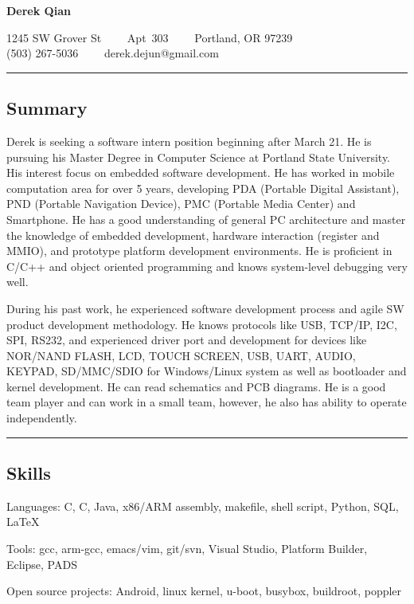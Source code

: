 \documentclass[10pt,letterpaper]{article}
\newenvironment{indentsection}[1]%
{\begin{list}{}%
	{\setlength{\leftmargin}{#1}}%
	\item[]%
}
{\end{list}}
\newcommand{\CPP}
{C\nolinebreak[4]\hspace{-.05em}\raisebox{.22ex}{\footnotesize\bf ++}}
\begin{document}
\begin{center}
{\LARGE \textbf{Derek Qian}}

1245 SW Grover St\ \ \textbullet
\ \ Apt\ 303\ \ \textbullet
\ \ Portland, OR 97239
\\
(503) 267-5036\ \ \textbullet
\ \ derek.dejun@gmail.com
\end{center}

\hrule
\vspace{-0.4em}
\subsection*{Summary}

\begin{indentsection}{\parindent}
Derek is seeking a software intern position beginning after March 21. He is pursuing his Master Degree in Computer Science at Portland State University. His interest focus on embedded software development. He has worked in mobile computation area for over 5 years, developing PDA (Portable Digital Assistant), PND (Portable Navigation Device), PMC (Portable Media Center) and Smartphone. He has a good understanding of general PC architecture and master the knowledge of embedded development, hardware interaction (register and MMIO), and prototype platform development environments. He is proficient in C/C++ and object oriented programming and knows system-level debugging very well.

During his past work, he experienced software development process and agile SW product development methodology. He knows protocols like USB, TCP/IP, I2C, SPI, RS232, and experienced driver port and development for devices like NOR/NAND FLASH, LCD, TOUCH SCREEN, USB, UART, AUDIO, KEYPAD, SD/MMC/SDIO for Windows/Linux system as well as bootloader and kernel development. He can read schematics and PCB diagrams. He is a good team player and can work in a small team, however, he also has ability to operate independently.
\end{indentsection}

\hrule
\vspace{-0.4em}
\subsection*{Skills}

\begin{indentsection}{\parindent}
\begin{description*}
	\item[Languages:]
	C, \CPP, Java, x86/ARM assembly, makefile, shell script, Python, SQL, \LaTeX
	\item[Tools:]
	gcc, arm-gcc, emacs/vim, git/svn, Visual Studio, Platform Builder, Eclipse, PADS
	\item[Open source projects:]
	Android, linux kernel, u-boot, busybox, buildroot, poppler
\end{description*}
\end{indentsection}
\end{document}
